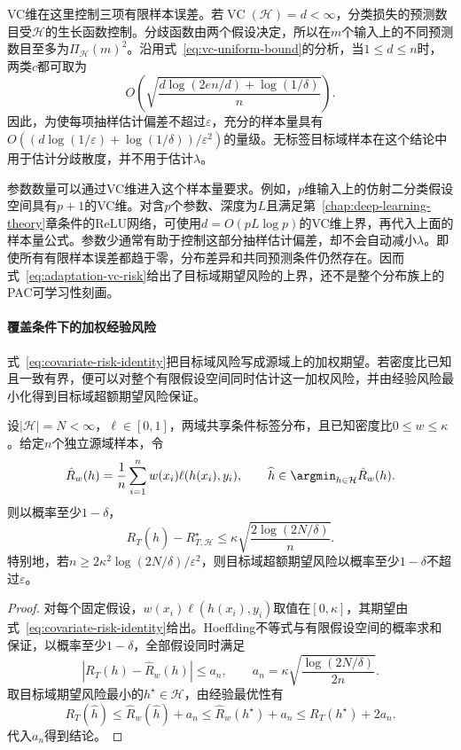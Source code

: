 VC维在这里控制三项有限样本误差。若$\operatorname{VC}(\mathcal H)=d<\infty$，分类损失的预测数目受$\mathcal H$的生长函数控制。分歧函数由两个假设决定，所以在$m$个输入上的不同预测数目至多为$\Pi_{\mathcal H}(m)^2$。沿用式~\eqref{eq:vc-uniform-bound}的分析，当$1\leq d\leq n$时，两类$c$都可取为
\[
 O\!\left(\sqrt{\frac{d\log(2en/d)+\log(1/\delta)}{n}}\right).
\]
因此，为使每项抽样估计偏差不超过$\varepsilon$，充分的样本量具有
$O((d\log(1/\varepsilon)+\log(1/\delta))/\varepsilon^2)$的量级。无标签目标域样本在这个结论中用于估计分歧散度，并不用于估计$\lambda$。

参数数量可以通过VC维进入这个样本量要求。例如，$p$维输入上的仿射二分类假设空间具有$p+1$的VC维。对含$p$个参数、深度为$L$且满足第~\ref{chap:deep-learning-theory}章条件的ReLU网络，可使用$d=O(pL\log p)$的VC维上界，再代入上面的样本量公式。参数少通常有助于控制这部分抽样估计偏差，却不会自动减小$\lambda$。即使所有有限样本误差都趋于零，分布差异和共同预测条件仍然存在。因而式~\eqref{eq:adaptation-vc-risk}给出了目标域期望风险的上界，还不是整个分布族上的PAC可学习性刻画。

\paragraph{覆盖条件下的加权经验风险}
\label{sec:adaptation-coverage}

式~\eqref{eq:covariate-risk-identity}把目标域风险写成源域上的加权期望。若密度比已知且一致有界，便可以对整个有限假设空间同时估计这一加权风险，并由经验风险最小化得到目标域超额期望风险保证。

\begin{theorem}[已知密度比下的迁移样本量界]
\label{thm:covariate-finite-pac}
设$|\mathcal H|=N<\infty$，$\ell\in[0,1]$，两域共享条件标签分布，且已知密度比$0\leq w\leq\kappa$。给定$n$个独立源域样本，令
\[
 \hat R_w(h)=\frac1n\sum_{i=1}^n
          w(x_i)\ell(h(x_i),y_i),\qquad
 \widehat h\in\argmin_{h\in\mathcal H}\hat R_w(h).
\]
则以概率至少$1-\delta$，
\begin{equation}
 R_T(\widehat h)-R_{T,\mathcal H}^{\star}
 \leq\kappa\sqrt{\frac{2\log(2N/\delta)}{n}}.
 \label{eq:covariate-finite-excess}
\end{equation}
特别地，若$n\geq2\kappa^2\log(2N/\delta)/\varepsilon^2$，则目标域超额期望风险以概率至少$1-\delta$不超过$\varepsilon$。
\end{theorem}
\begin{proof}
对每个固定假设，$w(x_i)\ell(h(x_i),y_i)$取值在$[0,\kappa]$，其期望由式~\eqref{eq:covariate-risk-identity}给出。Hoeffding不等式与有限假设空间的概率求和保证，以概率至少$1-\delta$，全部假设同时满足
\[
 |R_T(h)-\hat R_w(h)|\leq
 a_n,\qquad a_n=\kappa\sqrt{\frac{\log(2N/\delta)}{2n}}.
\]
取目标域期望风险最小的$h^\star\in\mathcal H$，由经验最优性有
\[
 R_T(\widehat h)
 \leq\hat R_w(\widehat h)+a_n
 \leq\hat R_w(h^\star)+a_n
 \leq R_T(h^\star)+2a_n.
\]
代入$a_n$得到结论。
\end{proof}

